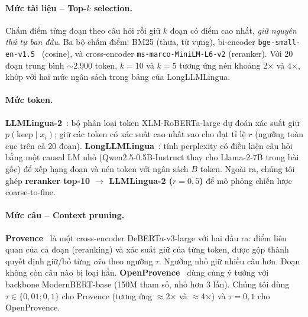 \paragraph{Mức tài liệu -- Top-$k$ selection.} Chấm điểm từng đoạn theo câu hỏi rồi giữ $k$ đoạn có
điểm cao nhất, \emph{giữ nguyên thứ tự ban đầu}. Ba bộ chấm điểm: BM25 (thưa, từ vựng), bi-encoder
\texttt{bge-small-en-v1.5}~\cite{xiao2024cpack} (cosine), và cross-encoder \texttt{ms-marco-MiniLM-L6-v2}
(reranker). Với 20 đoạn trung bình $\sim$2.900 token, $k=10$ và $k=5$ tương ứng nén khoảng 2$\times$ và
4$\times$, khớp với hai mức ngân sách trong bảng của LongLLMLingua.

\paragraph{Mức token.} \textbf{LLMLingua-2}~\cite{pan2024llmlingua2}: bộ phân loại token
XLM-RoBERTa-large dự đoán xác suất giữ $p(\text{keep}\mid x_i)$; giữ các token có xác suất cao nhất
sao cho đạt tỉ lệ $r$ (ngưỡng toàn cục trên cả 20 đoạn). \textbf{LongLLMLingua}~\cite{jiang2024longllmlingua}:
tính perplexity có điều kiện câu hỏi bằng một causal LM nhỏ (Qwen2.5-0.5B-Instruct thay cho Llama-2-7B
trong bài gốc) để xếp hạng đoạn và nén token với ngân sách $B$ token. Ngoài ra, chúng tôi ghép
\textbf{reranker top-10 $\rightarrow$ LLMLingua-2 ($r=0{,}5$)} để mô phỏng chiến lược coarse-to-fine.

\paragraph{Mức câu -- Context pruning.} \textbf{Provence}~\cite{chirkova2025provence} là một cross-encoder
DeBERTa-v3-large với hai đầu ra: điểm liên quan của cả đoạn (reranking) và xác suất giữ của từng token,
được gộp thành quyết định giữ/bỏ từng \emph{câu} theo ngưỡng $\tau$. Ngưỡng nhỏ giữ nhiều câu hơn.
Đoạn không còn câu nào bị loại hẳn. \textbf{OpenProvence}~\cite{openprovence} dùng cùng ý tưởng với
backbone ModernBERT-base (150M tham số, nhỏ hơn 3 lần). Chúng tôi dùng $\tau\in\{0{,}01; 0{,}1\}$
cho Provence (tương ứng $\approx$2$\times$ và $\approx$4$\times$) và $\tau=0{,}1$ cho OpenProvence.

